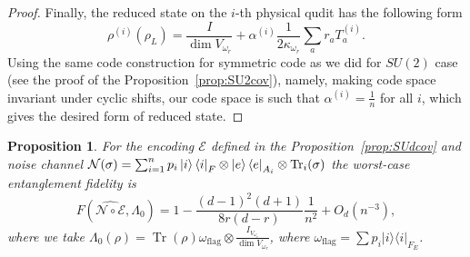 \documentclass[11pt,letterpaper]{article}
\theoremstyle{plain}
\theoremstyle{plain}
\theoremstyle{plain}
\theoremstyle{plain}
\theoremstyle{plain}
\theoremstyle{plain}
\theoremstyle{plain}
\newtheorem{smproposition}[smtheorem]{Proposition}
\theoremstyle{definition}
\theoremstyle{plain}
\begin{document}
\begin{proof}
Finally, the reduced state on the $i$-th physical qudit has the following form
\[
    \rho^{(i)}\left(\rho_L\right)=\frac{I}{\operatorname{dim} V_{\omega_r}}+\alpha^{(i)} \frac{1}{2\kappa_{\omega_r}} \sum_a r_a T_a^{(i)} .
\]
Using the same code construction for symmetric code as we did for $SU(2)$ case (see the proof of the Proposition~\ref{prop:SU2cov}), namely, making code space invariant under cyclic shifts, 
our code space is such that $\alpha^{(i)}=\frac{1}{n}$ for all $i$, which gives the desired form of reduced state.

\end{proof}


\begin{smproposition}\label{prop:SUdcovfidelity}
    For the encoding $\mathcal{E}$ defined in the Proposition~\ref{prop:SUdcov} and noise channel $\mathcal{N}(\sigma)=\sum_{i=1}^n p_i \ket{i}\bra{i}_F \otimes \ket{e}\bra{e}_{A_i} \otimes \operatorname{Tr}_i(\sigma)$ the worst-case entanglement fidelity is
    \[
        F(\widehat{\mathcal{N} \circ \mathcal{E}}, \Lambda_0)=1-\frac{(d-1)^2(d+1)}{8 r(d-r)}\frac{1}{n^2}+O_{d}\left(n^{-3}\right),
    \]
    where we take $\Lambda_0(\rho)=\operatorname{Tr}(\rho)\omega_{\text{flag}}\otimes\frac{I_{V_{\omega_r}}}{\operatorname{dim} V_{\omega_r}}$, where $\omega_{\text {flag}}=\sum p_i|i\rangle\langle i|_{F_E}$.
\end{smproposition}
\end{document}
